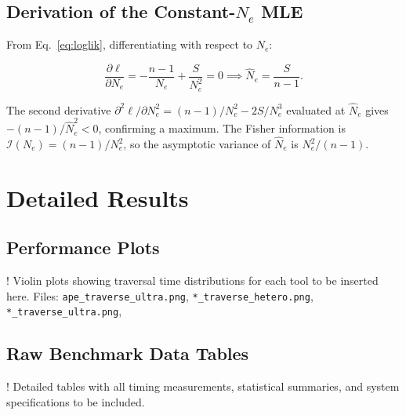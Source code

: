 \documentclass[11pt, a4paper]{article}
\begin{document}
\subsection{Derivation of the Constant-$N_e$ MLE}

From Eq.~\eqref{eq:loglik}, differentiating with respect to $N_e$:

\begin{equation*}
    \frac{\partial \ell}{\partial N_e}
    = -\frac{n-1}{N_e} + \frac{S}{N_e^2} = 0
    \implies
    \hat{N}_e = \frac{S}{n-1}.
\end{equation*}

The second derivative $\partial^2\ell/\partial N_e^2 = (n-1)/N_e^2 - 2S/N_e^3$
evaluated at $\hat{N}_e$ gives $-(n-1)/\hat{N}_e^2 < 0$, confirming a maximum.
The Fisher information is $\mathcal{I}(N_e) = (n-1)/N_e^2$, so the asymptotic
variance of $\hat{N}_e$ is $N_e^2/(n-1)$.

\section{Detailed Results}

\subsection{Performance Plots}

! Violin plots showing traversal time distributions for each tool to be
inserted here. Files: \texttt{ape\_traverse\_ultra.png},
\texttt{*\_traverse\_hetero.png},
\texttt{*\_traverse\_ultra.png},

\subsection{Raw Benchmark Data Tables}

! Detailed tables with all timing measurements, statistical summaries, and system
specifications to be included.
\end{document}
